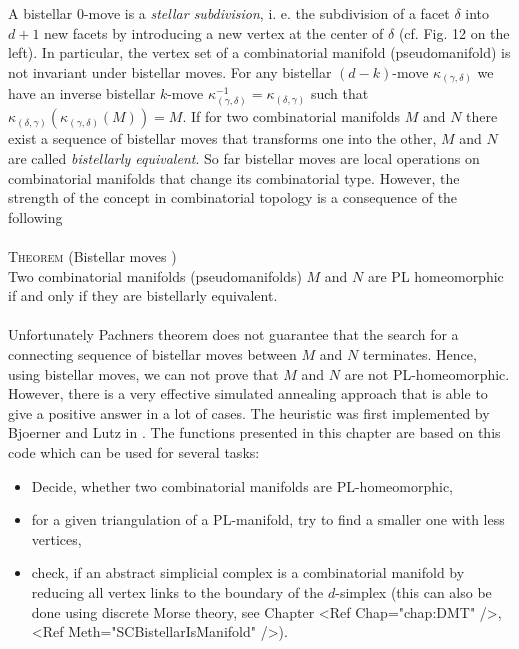 \documentclass[a4paper,11pt]{report}
\begin{document}
{{ A bistellar $0$-move is a \emph{stellar subdivision}, i. e. the subdivision of a facet $\delta$ into $d+1$ new facets by introducing a new vertex at the center of $\delta$ (cf. Fig. 12 on the left). In particular, the vertex set of a combinatorial
manifold (pseudomanifold) is not invariant under bistellar moves. For any
bistellar $(d-k)$-move $\kappa_{(\gamma,\delta)}$ we have an inverse bistellar $k$-move $\kappa^{-1}_{(\gamma,\delta)} = \kappa_{(\delta,\gamma)}$ such that $\kappa_{(\delta,\gamma)} ( \kappa_{(\gamma,\delta)} (M)) = M$. If for two combinatorial manifolds $M$ and $N$ there exist a sequence of bistellar moves that transforms one into the other, $M$ and $N$ are called \emph{bistellarly equivalent}. So far bistellar moves are local operations on combinatorial manifolds that
change its combinatorial type. However, the strength of the concept in
combinatorial topology is a consequence of the following\\
\\
 \textsc{Theorem} (Bistellar moves \cite{Pachner87KonstrMethKombHomeo})\\
 Two combinatorial manifolds (pseudomanifolds) $M$ and $N$ are PL homeomorphic if and only if they are bistellarly equivalent.\\
\\
 Unfortunately Pachners theorem does not guarantee that the search for a
connecting sequence of bistellar moves between $M$ and $N$ terminates. Hence, using bistellar moves, we can not prove that $M$ and $N$ are not PL-homeomorphic. However, there is a very effective simulated
annealing approach that is able to give a positive answer in a lot of cases.
The heuristic was first implemented by Bjoerner and Lutz in \cite{Bjoerner00SimplMnfBistellarFlips}. The functions presented in this chapter are based on this code which can be
used for several tasks: 
\begin{itemize}
	\item Decide, whether two combinatorial manifolds are PL-homeomorphic,
	\item for a given triangulation of a PL-manifold, try to find a smaller 
one with less vertices,
	\item check, if an abstract simplicial complex is a combinatorial manifold 
by reducing all vertex links to the boundary of the $d$-simplex (this can 
also be done using discrete Morse theory, see Chapter 
<Ref Chap="chap:DMT" />, <Ref Meth="SCBistellarIsManifold" />).
\end{itemize}
	
}}
\end{document}
